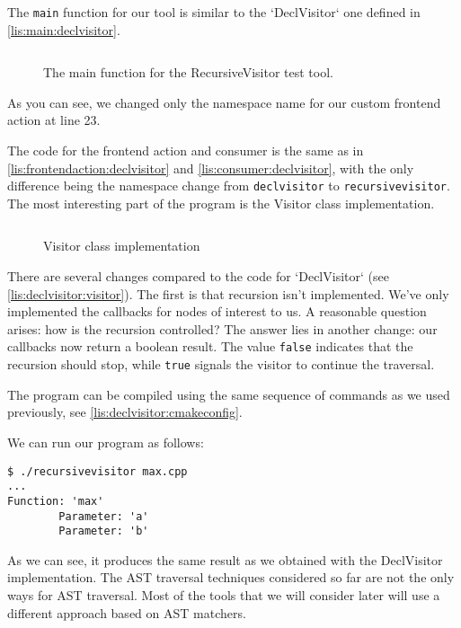 The \texttt{main} function for our tool is similar to the `DeclVisitor`
one defined in \cref{lis:main:declvisitor}. 
\begin{figure}[H]
\inputminted[highlightlines={23}]{c++}{src/part1/ch3_ast/recursivevisitor/RecursiveVisitor.cpp}
\caption{The main function for the RecursiveVisitor test tool.}
\label{lis:main:recursivevisitor}
\end{figure}
As you can see, we changed only the namespace name for our custom frontend
action at line 23. 

The code for the frontend action and consumer is the same as in
\cref{lis:frontendaction:declvisitor} and \cref{lis:consumer:declvisitor}, with
the only difference being the namespace change from
\texttt{declvisitor} to \texttt{recursivevisitor}. The most
interesting part of the program is the Visitor class implementation. 
\begin{figure}[H]
\inputminted{c++}{src/part1/ch3_ast/recursivevisitor/Visitor.hpp}
\caption{Visitor class implementation}
  \label{lis:recursivevisitor:visitor}
\end{figure}
There are several changes compared to the code for `DeclVisitor` (see
\cref{lis:declvisitor:visitor}). The first is that recursion isn't
implemented. We've only implemented the callbacks for nodes of interest to us. A
reasonable question arises: how is the recursion controlled? The answer lies in
another change: our callbacks now return a boolean result. The value
\texttt{false} indicates that the recursion should stop, while
\texttt{true} signals the visitor to continue the traversal. 

The program can be compiled using the same sequence of commands as we used
previously, see \cref{lis:declvisitor:cmakeconfig}.

We can run our program as follows:
\begin{adjustwidth}{0em}{0em}
\begin{verbatim}
$ ./recursivevisitor max.cpp 
...
Function: 'max'
        Parameter: 'a'
        Parameter: 'b'
\end{verbatim}
\end{adjustwidth}
As we can see, it produces the same result as we obtained with the DeclVisitor
implementation. The AST traversal techniques considered so far are not the only
ways for AST traversal. Most of the tools that we will consider later will use a
different approach based on AST matchers. 

